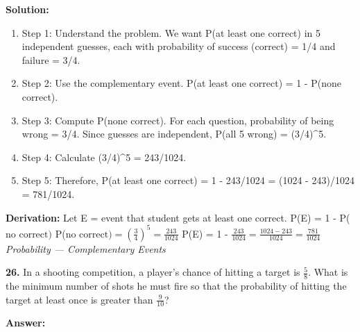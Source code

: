 \documentclass[12pt,a4paper]{exam}
\newcommand{\fitmath}[1]{%
  \sbox{\schmathbox}{$\displaystyle #1$}%
  \ifdim\wd\schmathbox>\linewidth
    \resizebox{\linewidth}{!}{\usebox{\schmathbox}}%
  \else
    \usebox{\schmathbox}%
  \fi}
\begin{document}
\begin{questions}
\textbf{Solution:}
\begin{enumerate}
  \item Step 1: Understand the problem. We want P(at least one correct) in 5 independent guesses, each with probability of success (correct) = 1/4 and failure = 3/4.
  \item Step 2: Use the complementary event. P(at least one correct) = 1 - P(none correct).
  \item Step 3: Compute P(none correct). For each question, probability of being wrong = 3/4. Since guesses are independent, P(all 5 wrong) = (3/4)\textasciicircum{}5.
  \item Step 4: Calculate (3/4)\textasciicircum{}5 = 243/1024.
  \item Step 5: Therefore, P(at least one correct) = 1 - 243/1024 = (1024 - 243)/1024 = 781/1024.
\end{enumerate}
\textbf{Derivation:}
Let  E  = event that student gets at least one correct.
 P(E) = 1 - P($\text{no correct})$ 
 P($\text{no correct}) = \left(\frac{3}{4}\right)^5 = \frac{243}{1024}$ 
 P(E) = 1 - $\frac{243}{1024} = \frac{1024-243}{1024} = \frac{781}{1024}$ 
\hfill \textit{Probability — Complementary Events}
\vspace{0.3cm}

\question \textbf{26.} In a shooting competition, a player's chance of hitting a target is $\frac{5}{8}$. What is the minimum number of shots he must fire so that the probability of hitting the target at least once is greater than $\frac{9}{10}$?

\textbf{Answer:}
\begin{center}
\fitmath{4}
\end{center}


\end{questions}
\end{document}
